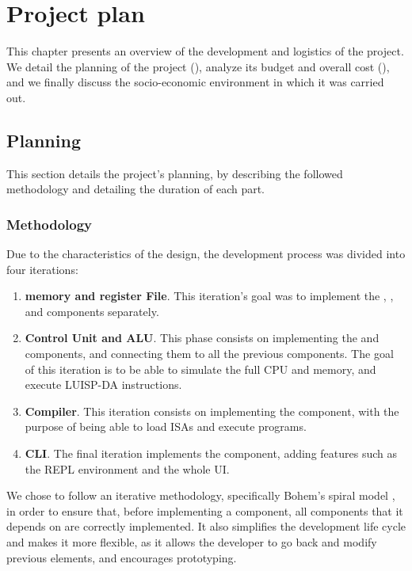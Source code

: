 \chapter{Project plan}\label{chap:planning}
This chapter presents an overview of the development and logistics of the project. We detail the planning of the project (), analyze its budget and overall cost (), and we finally discuss the socio-economic environment in which it was carried out.


\section{Planning}\label{sec:planning}
This section details the project's planning, by describing the followed methodology and detailing the duration of each part.

\subsection{Methodology}
Due to the characteristics of the design, the development process was divided into four iterations:
\begin{enumerate}[label=\Roman*.]
  \item \textbf{\Gls{memory} and \Gls{register} File}. This iteration's goal was to implement the , , and  components separately.
  \item \textbf{Control Unit and \gls{ALU}}. This phase consists on implementing the  and  components, and connecting them to all the previous components. The goal of this iteration is to be able to simulate the full \gls{CPU} and \gls{memory}, and execute LUISP-DA instructions.
  \item \textbf{Compiler}. This iteration consists on implementing the  component, with the purpose of being able to load \glspl{ISA} and execute programs.
  \item \textbf{\gls{CLI}}. The final iteration implements the  component, adding features such as the \gls{REPL environment} and the whole \gls{UI}.
\end{enumerate}

We chose to follow an iterative methodology, specifically Bohem's spiral model \parencite{BohemBSpiral}, in order to ensure that, before implementing a component, all components that it depends on are correctly implemented. It also simplifies the development life cycle and makes it more flexible, as it allows the developer to go back and modify previous elements, and encourages prototyping.

